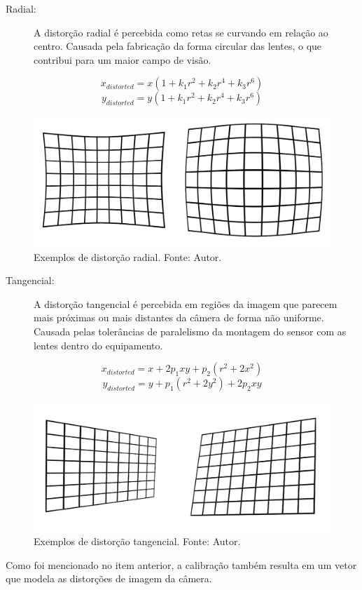 \begin{description}
    \item[Radial:] A distorção radial é percebida como retas se curvando em relação ao centro. Causada pela fabricação da forma circular das lentes, o que contribui para um maior campo de visão.
\end{description}
\[ x_{distorted} = x(1+k_1 r^2 + k_2 r^4 + k_3 r^6) \]
\[ y_{distorted} = y(1+k_1 r^2 + k_2 r^4 + k_3 r^6) \]
\begin{figure}[H] %
    \centering
    \includegraphics[width=.65\linewidth]{figuras/radial-dist.png}
    \caption{Exemplos de distorção radial. Fonte: Autor.}
    \label{fig:radial_dist}
\end{figure}
\begin{description}
    \item[Tangencial:] A distorção tangencial é percebida em regiões da imagem que parecem mais próximas ou mais distantes da câmera de forma não uniforme. Causada pelas tolerâncias de paralelismo da montagem do sensor com as lentes dentro do equipamento.
\end{description}
\[ x_{distorted} = x + 2 p_1 x y + p_2 (r^2 + 2x^2)\]
\[ y_{distorted} = y + p_1(r^2+2y^2)+2p_2xy\]
\begin{figure}[H] %
    \centering
    \includegraphics[width=.65\linewidth]{figuras/tan-dist.png}
    \caption{Exemplos de distorção tangencial. Fonte: Autor.}
    \label{fig:tan_dist}
\end{figure}
Como foi mencionado no item anterior, a calibração também resulta em um vetor que modela as distorções de imagem da câmera. 


